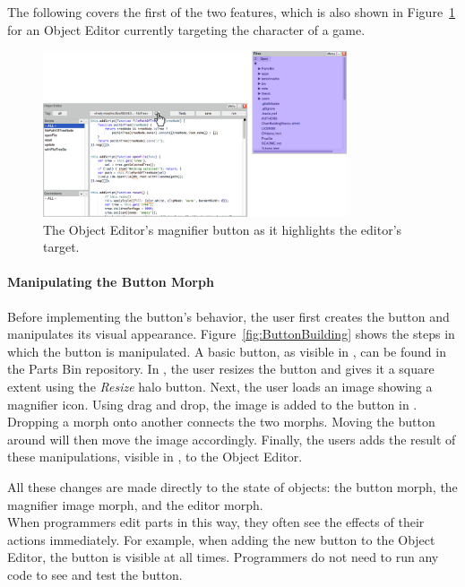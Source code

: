 The following covers the first of the two features, which is also shown in Figure~\ref{fig:MagnifierBehavior} for an Object Editor currently targeting the character of a game.

\begin{figure}[h]
    \centering
    \includegraphics[width=0.8\textwidth]{figures/3_motivation/2_magnifierBehavior.png}
    \caption{The Object Editor's magnifier button as it highlights the editor's target.}
    \label{fig:MagnifierBehavior}
\end{figure}

\paragraph{Manipulating the Button Morph}
Before implementing the button's behavior, the user first creates the button and manipulates its visual appearance.
Figure~\ref{fig:ButtonBuilding} shows the steps in which the button is manipulated.
A basic button, as visible in , can be found in the Parts Bin repository.
In , the user resizes the button and gives it a square extent using the \emph{Resize} halo button.
Next, the user loads an image showing a magnifier icon.
Using drag and drop, the image is added to the button in .
Dropping a morph onto another connects the two morphs.
Moving the button around will then move the image accordingly.
Finally, the users adds the result of these manipulations, visible in , to the Object Editor.

All these changes are made directly to the state of objects: the button morph, the magnifier image morph, and the editor morph.\\
When programmers edit parts in this way, they often see the effects of their actions immediately.
For example, when adding the new button to the Object Editor, the button is visible at all times.
Programmers do not need to run any code to see and test the button.

